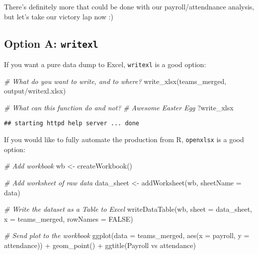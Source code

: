 \documentclass[
]{article}
\newenvironment{Shaded}{\begin{snugshade}}{\end{snugshade}}
\newcommand{\AttributeTok}[1]{\textcolor[rgb]{0.77,0.63,0.00}{#1}}
\newcommand{\CommentTok}[1]{\textcolor[rgb]{0.56,0.35,0.01}{\textit{#1}}}
\newcommand{\ConstantTok}[1]{\textcolor[rgb]{0.00,0.00,0.00}{#1}}
\newcommand{\FunctionTok}[1]{\textcolor[rgb]{0.00,0.00,0.00}{#1}}
\newcommand{\NormalTok}[1]{#1}
\newcommand{\OtherTok}[1]{\textcolor[rgb]{0.56,0.35,0.01}{#1}}
\newcommand{\SpecialCharTok}[1]{\textcolor[rgb]{0.00,0.00,0.00}{#1}}
\newcommand{\StringTok}[1]{\textcolor[rgb]{0.31,0.60,0.02}{#1}}
\begin{document}
There's definitely more that could be done with our payroll/attendnance
analysis, but let's take our victory lap now :)

\hypertarget{option-a-writexl}{%
\subsection{\texorpdfstring{Option A:
\texttt{writexl}}{Option A: writexl}}\label{option-a-writexl}}

If you want a pure data dump to Excel, \texttt{writexl} is a good
option:

\begin{Shaded}
\begin{Highlighting}[]
\CommentTok{\# What do you want to write, and to where?}
\FunctionTok{write\_xlsx}\NormalTok{(teams\_merged, }\StringTok{\textquotesingle{}output/writexl.xlsx\textquotesingle{}}\NormalTok{)}
\end{Highlighting}
\end{Shaded}

\begin{Shaded}
\begin{Highlighting}[]
\CommentTok{\# What can this function do and not?}
\CommentTok{\# Awesome Easter Egg}
\NormalTok{?write\_xlsx}
\end{Highlighting}
\end{Shaded}

\begin{verbatim}
## starting httpd help server ... done
\end{verbatim}

If you would like to fully automate the production from R,
\texttt{openxlsx} is a good option:

\begin{Shaded}
\begin{Highlighting}[]
\CommentTok{\# Add workbook}
\NormalTok{wb }\OtherTok{\textless{}{-}} \FunctionTok{createWorkbook}\NormalTok{()}

\CommentTok{\# Add worksheet of raw data}
\NormalTok{data\_sheet }\OtherTok{\textless{}{-}} \FunctionTok{addWorksheet}\NormalTok{(wb, }\AttributeTok{sheetName =} \StringTok{\textquotesingle{}data\textquotesingle{}}\NormalTok{)}

\CommentTok{\# Write the dataset as a Table to Excel}
\FunctionTok{writeDataTable}\NormalTok{(wb, }\AttributeTok{sheet =}\NormalTok{ data\_sheet, }\AttributeTok{x =}\NormalTok{ teams\_merged, }\AttributeTok{rowNames =} \ConstantTok{FALSE}\NormalTok{)}


\CommentTok{\# Send plot to the workbook}
\FunctionTok{ggplot}\NormalTok{(}\AttributeTok{data =}\NormalTok{ teams\_merged, }\FunctionTok{aes}\NormalTok{(}\AttributeTok{x =}\NormalTok{ payroll, }\AttributeTok{y =}\NormalTok{ attendance)) }\SpecialCharTok{+}
  \FunctionTok{geom\_point}\NormalTok{() }\SpecialCharTok{+} 
  \FunctionTok{ggtitle}\NormalTok{(}\StringTok{\textquotesingle{}Payroll vs attendance\textquotesingle{}}\NormalTok{)}
\end{Highlighting}
\end{Shaded}
\end{document}

